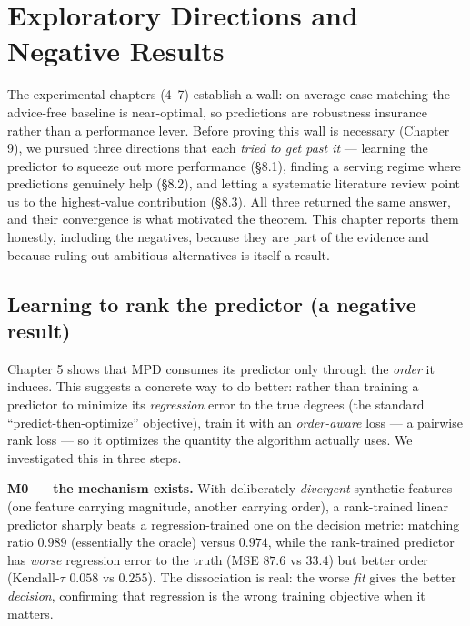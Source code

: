 \chapter{Exploratory Directions and Negative Results}\label{exploratory-directions-and-negative-results}

The experimental chapters (4--7) establish a wall: on average-case matching the advice-free
baseline is near-optimal, so predictions are robustness insurance rather than a performance
lever. Before proving this wall is necessary (Chapter 9), we pursued three directions that
each \emph{tried to get past it} --- learning the predictor to squeeze out more performance
(§8.1), finding a serving regime where predictions genuinely help (§8.2), and letting a
systematic literature review point us to the highest-value contribution (§8.3). All three
returned the same answer, and their convergence is what motivated the theorem. This chapter
reports them honestly, including the negatives, because they are part of the evidence and
because ruling out ambitious alternatives is itself a result.

\section{Learning to rank the predictor (a negative result)}\label{learning-to-rank-the-predictor-a-negative-result}

Chapter 5 shows that MPD consumes its predictor only through the \emph{order} it induces. This
suggests a concrete way to do better: rather than training a predictor to minimize its
\emph{regression} error to the true degrees (the standard ``predict-then-optimize'' objective),
train it with an \emph{order-aware} loss --- a pairwise rank loss --- so it optimizes the quantity
the algorithm actually uses. We investigated this in three steps.

\textbf{M0 --- the mechanism exists.} With deliberately \emph{divergent} synthetic features (one feature
carrying magnitude, another carrying order), a rank-trained linear predictor sharply beats a
regression-trained one on the decision metric: matching ratio \(0.989\) (essentially the
oracle) versus \(0.974\), while the rank-trained predictor has \emph{worse} regression error to the
truth (MSE \(87.6\) vs \(33.4\)) but better order (Kendall-\(\tau\) \(0.058\) vs \(0.255\)). The
dissociation is real: the worse \emph{fit} gives the better \emph{decision}, confirming that
regression is the wrong training objective when it matters.

